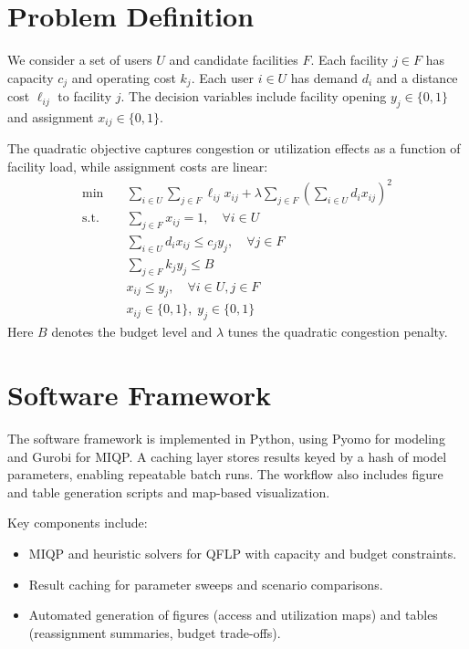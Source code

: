 \documentclass[11pt]{article}
\begin{document}
\section{Problem Definition}
We consider a set of users $U$ and candidate facilities $F$. Each facility $j \in F$ has capacity $c_j$ and operating cost $k_j$. Each user $i \in U$ has demand $d_i$ and a distance cost $\ell_{ij}$ to facility $j$. The decision variables include facility opening $y_j \in \{0,1\}$ and assignment $x_{ij} \in \{0,1\}$.

The quadratic objective captures congestion or utilization effects as a function of facility load, while assignment costs are linear:
\begin{align}
\min \quad & \sum_{i \in U} \sum_{j \in F} \ell_{ij} x_{ij} + \lambda \sum_{j \in F} \left(\sum_{i \in U} d_i x_{ij}\right)^2 \\
\text{s.t.} \quad & \sum_{j \in F} x_{ij} = 1, \quad \forall i \in U \\
& \sum_{i \in U} d_i x_{ij} \le c_j y_j, \quad \forall j \in F \\
& \sum_{j \in F} k_j y_j \le B \\
& x_{ij} \le y_j, \quad \forall i \in U, j \in F \\
& x_{ij} \in \{0,1\},\; y_j \in \{0,1\}
\end{align}
Here $B$ denotes the budget level and $\lambda$ tunes the quadratic congestion penalty.

\section{Software Framework}
The software framework is implemented in Python, using Pyomo for modeling and Gurobi for MIQP. A caching layer stores results keyed by a hash of model parameters, enabling repeatable batch runs. The workflow also includes figure and table generation scripts and map-based visualization.

Key components include:
\begin{itemize}[leftmargin=*]
\item MIQP and heuristic solvers for QFLP with capacity and budget constraints.
\item Result caching for parameter sweeps and scenario comparisons.
\item Automated generation of figures (access and utilization maps) and tables (reassignment summaries, budget trade-offs).
\end{itemize}
\end{document}

